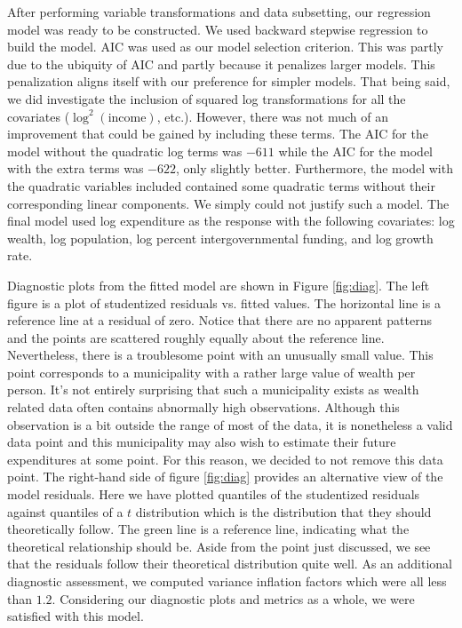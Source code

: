 \documentclass{article}\usepackage[]{graphicx}\usepackage[]{color}
\begin{document}
After performing variable transformations and data subsetting, our regression model was ready to be constructed. We used backward stepwise regression to build the model. AIC was used as our model selection criterion. This was partly due to the ubiquity of AIC and partly because it penalizes larger models. This penalization aligns itself with our preference for simpler models. That being said, we did investigate the inclusion of squared log transformations for all the covariates ($\log^2(\text{income})$, etc.). However, there was not much of an improvement that could be gained by including these terms. The AIC for the model without the quadratic log terms was $-611$ while the AIC for the model with the extra terms was $-622$, only slightly better. Furthermore, the model with the quadratic variables included contained some quadratic terms without their corresponding linear components. We simply could not justify such a model. The final model used log expenditure as the response with the following covariates: log wealth, log population, log percent intergovernmental funding, and log growth rate.



Diagnostic plots from the fitted model are shown in Figure \ref{fig:diag}. The left figure is a plot of studentized residuals vs. fitted values. The horizontal line is a reference line at a residual of zero. Notice that there are no apparent patterns and the points are scattered roughly equally about the reference line. Nevertheless, there is a troublesome point with an unusually small value. This point corresponds to a municipality with a rather large value of wealth per person. It's not entirely surprising that such a municipality exists as wealth related data often contains abnormally high observations. Although this observation is a bit outside the range of most of the data, it is nonetheless a valid data point and this municipality may also wish to estimate their future expenditures at some point. For this reason, we decided to not remove this data point. The right-hand side of figure \ref{fig:diag} provides an alternative view of the model residuals. Here we have plotted quantiles of the studentized residuals against quantiles of a $t$ distribution which is the distribution that they should theoretically follow. The green line is a reference line, indicating what the theoretical relationship should be. Aside from the point just discussed, we see that the residuals follow their theoretical distribution quite well. As an additional diagnostic assessment, we computed variance inflation factors which were all less than $1.2$. Considering our diagnostic plots and metrics as a whole, we were satisfied with this model.
\end{document}
